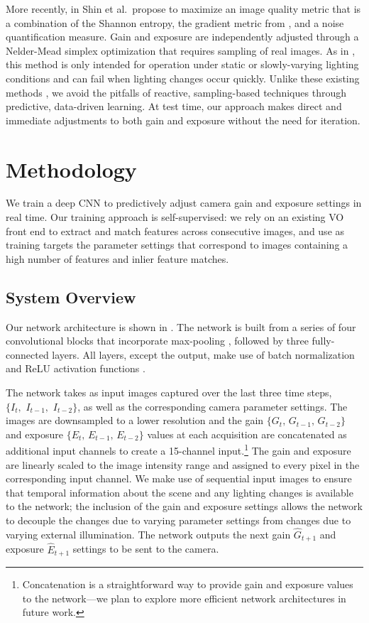 \documentclass[letterpaper, 10pt, journal, twoside]{IEEEtran}
\begin{document}
More recently, in \cite{Shin2019} Shin et al.\ propose to maximize an image quality metric that is a combination of the Shannon entropy, the gradient metric from \cite{Shim2014}, and a noise quantification measure.
Gain and exposure are independently adjusted through a Nelder-Mead simplex optimization  that requires sampling of real images.  
As in \cite{Lu2010}, this method is only intended for operation under static or slowly-varying lighting conditions and can fail when lighting changes occur quickly.
Unlike these existing methods \cite{Shim2014, Zhang2017, Kim2018b, Lu2010, Shin2019}, we avoid the pitfalls of reactive, sampling-based techniques through predictive, data-driven learning. At test time, our approach makes direct and immediate adjustments to both gain and exposure without the need for iteration. 

\section{Methodology}
\label{sec:method}

We train a deep CNN to predictively adjust camera gain and exposure settings in real time. Our training approach is self-supervised: we rely on an existing VO front end to extract and match features across consecutive images, and use as training targets the parameter settings that correspond to images containing a high number of features and inlier feature matches. 

\subsection{System Overview}

Our network architecture is shown in . The network is built from a series of four convolutional blocks that incorporate max-pooling \cite{Zhou1988}, followed by three fully-connected layers. All layers, except the output, make use of batch normalization \cite{Ioffe2015} and ReLU activation functions \cite{He2016}.

The network takes as input images captured over the last three time steps, $\{I_t,\,\,  I_{t-1},\,\, I_{t-2}\}$, as well as the corresponding camera parameter settings. The images are downsampled to a lower resolution and the gain $\{G_t,\, G_{t-1},\, G_{t-2}\}$ and exposure $\{E_t,\, E_{t-1},\, E_{t-2}\}$ values at each acquisition are concatenated as additional input channels to create a 15-channel input.\footnote{Concatenation is a straightforward way to provide gain and exposure values to the network---we plan to explore more efficient network architectures in future work.}
The gain and exposure are linearly scaled to the image intensity range and assigned to every pixel in the corresponding input channel.
We make use of sequential input images to ensure that temporal information about the scene and any lighting changes is available to the network; the inclusion of the gain and exposure settings allows the network to decouple the changes due to varying parameter settings from changes due to varying external illumination. 
The network outputs the next gain $\hat{G}_{t+1}$ and exposure $\hat{E}_{t+1}$ settings to be sent to the camera.
\end{document}
